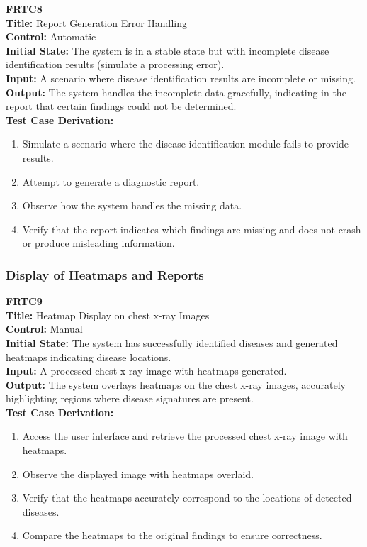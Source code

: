 \documentclass[12pt, titlepage]{article}
\begin{document}
\textbf{FRTC8}\\
\textbf{Title:} Report Generation Error Handling\\
\textbf{Control:} Automatic\\
\textbf{Initial State:} The system is in a stable state but with incomplete disease identification results (simulate a processing error).\\
\textbf{Input:} A scenario where disease identification results are incomplete or missing.\\
\textbf{Output:} The system handles the incomplete data gracefully, indicating in the report that certain findings could not be determined.\\
\textbf{Test Case Derivation:}
\begin{enumerate}
  \item Simulate a scenario where the disease identification module fails to provide results.
  \item Attempt to generate a diagnostic report.
  \item Observe how the system handles the missing data.
  \item Verify that the report indicates which findings are missing and does not crash or produce misleading information.
\end{enumerate}
\vspace{1em}

\subsubsection{Display of Heatmaps and Reports}
\textbf{FRTC9}\\
\textbf{Title:} Heatmap Display on chest x-ray Images\\
\textbf{Control:} Manual\\
\textbf{Initial State:} The system has successfully identified diseases and generated heatmaps indicating disease locations.\\
\textbf{Input:} A processed chest x-ray image with heatmaps generated.\\
\textbf{Output:} The system overlays heatmaps on the chest x-ray images, accurately highlighting regions where disease signatures are present.\\
\textbf{Test Case Derivation:}
\begin{enumerate}
  \item Access the user interface and retrieve the processed chest x-ray image with heatmaps.
  \item Observe the displayed image with heatmaps overlaid.
  \item Verify that the heatmaps accurately correspond to the locations of detected diseases.
  \item Compare the heatmaps to the original findings to ensure correctness.
\end{enumerate}
\vspace{1em}
\end{document}
